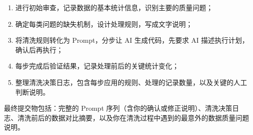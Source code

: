 \begin{enumerate}
  \item 进行初始审查，记录数据的基本统计信息，识别主要的质量问题；
  \item 确定每类问题的缺失机制，设计处理规则，写成文字说明；
  \item 将清洗规则转化为 Prompt，分步让 AI 生成代码，先要求 AI 描述执行计划，确认后再执行；
  \item 每步完成后验证结果，记录处理前后的关键统计变化；
  \item 整理清洗决策日志，包含每步应用的规则、处理的记录数量，以及关键的人工判断说明。
\end{enumerate}

最终提交物包括：完整的 Prompt 序列（含你的确认或修正说明）、清洗决策日志、清洗前后的数据对比摘要，以及你在清洗过程中遇到的最意外的数据质量问题说明。





